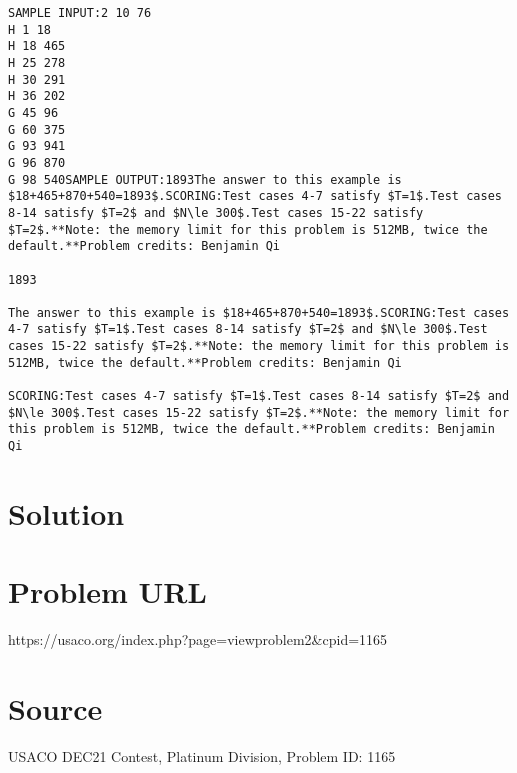 \documentclass[12pt]{article}
\begin{document}
\begin{verbatim}
SAMPLE INPUT:2 10 76
H 1 18
H 18 465
H 25 278
H 30 291
H 36 202
G 45 96
G 60 375
G 93 941
G 96 870
G 98 540SAMPLE OUTPUT:1893The answer to this example is $18+465+870+540=1893$.SCORING:Test cases 4-7 satisfy $T=1$.Test cases 8-14 satisfy $T=2$ and $N\le 300$.Test cases 15-22 satisfy $T=2$.**Note: the memory limit for this problem is 512MB, twice the default.**Problem credits: Benjamin Qi

1893

The answer to this example is $18+465+870+540=1893$.SCORING:Test cases 4-7 satisfy $T=1$.Test cases 8-14 satisfy $T=2$ and $N\le 300$.Test cases 15-22 satisfy $T=2$.**Note: the memory limit for this problem is 512MB, twice the default.**Problem credits: Benjamin Qi

SCORING:Test cases 4-7 satisfy $T=1$.Test cases 8-14 satisfy $T=2$ and $N\le 300$.Test cases 15-22 satisfy $T=2$.**Note: the memory limit for this problem is 512MB, twice the default.**Problem credits: Benjamin Qi
\end{verbatim}

\section*{Solution}


\section*{Problem URL}
https://usaco.org/index.php?page=viewproblem2&cpid=1165

\section*{Source}
USACO DEC21 Contest, Platinum Division, Problem ID: 1165
\end{document}
